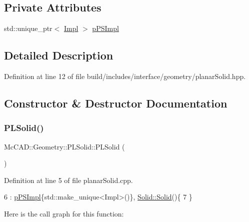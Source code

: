 \subsection*{Private Attributes}
\begin{DoxyCompactItemize}
\item 
std\+::unique\+\_\+ptr$<$ \hyperlink{classMcCAD_1_1Geometry_1_1PLSolid_1_1Impl}{Impl} $>$ \hyperlink{classMcCAD_1_1Geometry_1_1PLSolid_afdcf89bfac48acf8572e502b9b44d324}{p\+P\+S\+Impl}
\end{DoxyCompactItemize}


\subsection{Detailed Description}


Definition at line 12 of file build/includes/interface/geometry/planar\+Solid.\+hpp.



\subsection{Constructor \& Destructor Documentation}
\mbox{\label{classMcCAD_1_1Geometry_1_1PLSolid_a27c914f54302cb367c1368eb999ca82a}} 
\subsubsection{\texorpdfstring{P\+L\+Solid()}{PLSolid()}\hspace{0.1cm}{\footnotesize\ttfamily [1/2]}}
{\footnotesize\ttfamily Mc\+C\+A\+D\+::\+Geometry\+::\+P\+L\+Solid\+::\+P\+L\+Solid (\begin{DoxyParamCaption}{ }\end{DoxyParamCaption})}



Definition at line 5 of file planar\+Solid.\+cpp.


\begin{DoxyCode}
6   : \hyperlink{classMcCAD_1_1Geometry_1_1PLSolid_afdcf89bfac48acf8572e502b9b44d324}{pPSImpl}\{std::make\_unique<Impl>()\}, \hyperlink{classMcCAD_1_1Geometry_1_1Solid_ab54263b54174e2742c60e9c94e151819}{Solid::Solid}()\{
7 \}
\end{DoxyCode}
Here is the call graph for this function\+:
\mbox{\label{classMcCAD_1_1Geometry_1_1PLSolid_a8e6f560520c5912f097d553033774c42}} 

